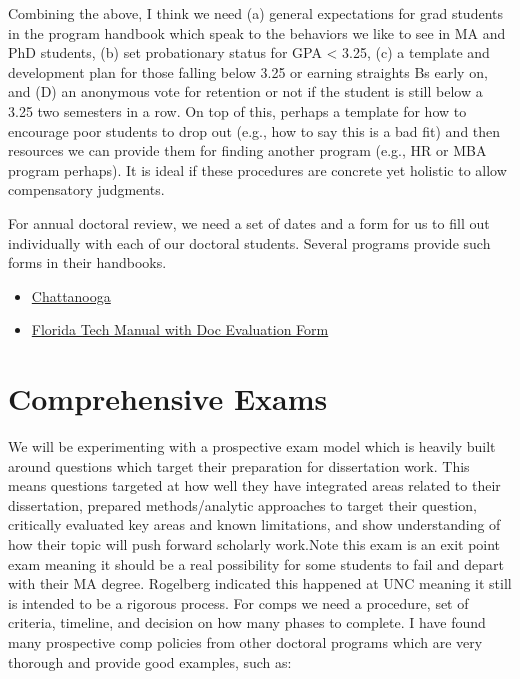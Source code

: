 \documentclass[
]{book}
\providecommand{\tightlist}{%
  \setlength{\itemsep}{0pt}\setlength{\parskip}{0pt}}
\begin{document}
Combining the above, I think we need (a) general expectations for grad students in the program handbook which speak to the behaviors we like to see in MA and PhD students, (b) set probationary status for GPA \textless{} 3.25, (c) a template and development plan for those falling below 3.25 or earning straights Bs early on, and (D) an anonymous vote for retention or not if the student is still below a 3.25 two semesters in a row. On top of this, perhaps a template for how to encourage poor students to drop out (e.g., how to say this is a bad fit) and then resources we can provide them for finding another program (e.g., HR or MBA program perhaps). It is ideal if these procedures are concrete yet holistic to allow compensatory judgments.

For annual doctoral review, we need a set of dates and a form for us to fill out individually with each of our doctoral students. Several programs provide such forms in their handbooks.

\begin{itemize}
\tightlist
\item
  \href{http://catalog.utc.edu/content.php?catoid=15\&navoid=465\#Academic_Dismissal}{Chattanooga}
\item
  \href{https://www.fit.edu/media/site-specific/wwwfitedu/college-of-psychology-and-liberal-arts/io/documents/2019-IO-Student-Handbook.pdf}{Florida Tech Manual with Doc Evaluation Form}
\end{itemize}

\hypertarget{comps}{%
\chapter{Comprehensive Exams}\label{comps}}

We will be experimenting with a prospective exam model which is heavily built around questions which target their preparation for dissertation work. This means questions targeted at how well they have integrated areas related to their dissertation, prepared methods/analytic approaches to target their question, critically evaluated key areas and known limitations, and show understanding of how their topic will push forward scholarly work.Note this exam is an exit point exam meaning it should be a real possibility for some students to fail and depart with their MA degree. Rogelberg indicated this happened at UNC meaning it still is intended to be a rigorous process. For comps we need a procedure, set of criteria, timeline, and decision on how many phases to complete. I have found many prospective comp policies from other doctoral programs which are very thorough and provide good examples, such as:
\end{document}
